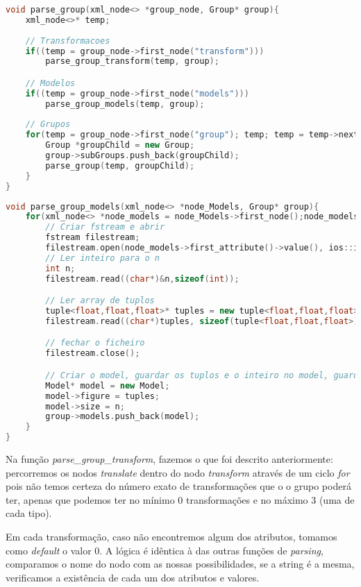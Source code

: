 \documentclass[14pt, a4 paper]{report}
\begin{document}
\begin{lstlisting}[language = c++]
void parse_group(xml_node<> *group_node, Group* group){
    xml_node<>* temp;
    
    // Transformacoes
    if((temp = group_node->first_node("transform")))
        parse_group_transform(temp, group);

    // Modelos 
    if((temp = group_node->first_node("models")))
        parse_group_models(temp, group);
    
    // Grupos
    for(temp = group_node->first_node("group"); temp; temp = temp->next_sibling("group")){
        Group *groupChild = new Group;
        group->subGroups.push_back(groupChild);
        parse_group(temp, groupChild);
    }
}
\end{lstlisting}

\begin{lstlisting}[language = c++]
void parse_group_models(xml_node<> *node_Models, Group* group){
    for(xml_node<> *node_models = node_Models->first_node();node_models; node_models = node_models->next_sibling()){
        // Criar fstream e abrir
        fstream filestream;
        filestream.open(node_models->first_attribute()->value(), ios::in|ios::binary);
        // Ler inteiro para o n
        int n;
        filestream.read((char*)&n,sizeof(int));

        // Ler array de tuplos
        tuple<float,float,float>* tuples = new tuple<float,float,float>[n];
        filestream.read((char*)tuples, sizeof(tuple<float,float,float>) * n);

        // fechar o ficheiro
        filestream.close();

        // Criar o model, guardar os tuplos e o inteiro no model, guardar o model no group
        Model* model = new Model;
        model->figure = tuples;
        model->size = n;
        group->models.push_back(model);
    }
}
\end{lstlisting}

Na função \textit{parse\_group\_transform}, fazemos o que foi descrito anteriormente: percorremos os nodos \textit{translate} dentro do nodo \textit{transform} através de um ciclo \textit{for} pois não temos certeza do número exato de transformações que o o grupo poderá ter, apenas que podemos ter no mínimo 0 transformações e no máximo 3 (uma de cada tipo).

Em cada transformação, caso não encontremos algum dos atributos, tomamos como \textit{default} o valor 0. A lógica é idêntica à das outras funções de \textit{parsing}, comparamos o nome do nodo com as nossas possibilidades, se a string é a mesma, verificamos a existência de cada um dos atributos e valores.
\end{document}
